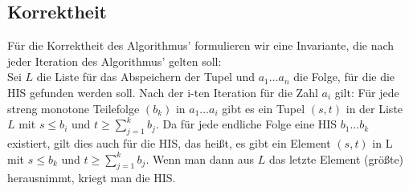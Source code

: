 \subsection{Korrektheit}
Für die Korrektheit des Algorithmus' formulieren wir eine Invariante, die nach jeder Iteration des Algorithmus' gelten soll:\\
Sei $L$ die Liste für das Abspeichern der Tupel und $a_1 \dots a_n$ die Folge, für die die HIS gefunden werden soll. Nach der i-ten Iteration für die Zahl $a_i$ gilt: Für jede streng monotone Teilefolge $(b_k)$ in $a_1 \dots a_i$ gibt es ein Tupel $(s,t)$ in der Liste $L$ mit $s\leq b_i$ und $ t \geq \sum_{j=1}^k b_j$. Da für jede endliche Folge eine HIS $b_1 \dots b_k$ existiert, gilt dies auch für die HIS, das heißt, es gibt ein Element $(s,t)$ in L mit $s\leq b_k$ und $t\geq \sum_{j=1}^k b_j$. Wenn man dann aus $L$ das letzte Element (größte) herausnimmt, kriegt man die HIS.

\newtheorem{beweis}{Beweis}

